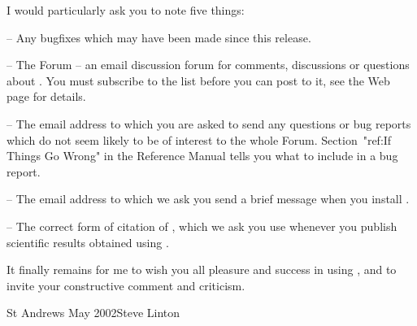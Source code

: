 I would particularly ask you to note five things:
\beginlist%
\item{--} Any bugfixes which may have been made since this release.
\item{--} The  {\GAP} Forum -- an email discussion forum for comments,
discussions or questions about {\GAP}. You must subscribe to the list
before you can post to it, see the Web page for details.
\item{--} The email address  to which you
are asked to send any questions or bug reports which do not seem likely
to be of interest to the whole {\GAP} Forum. Section~"ref:If Things Go Wrong"
in the Reference Manual tells you what to include in a bug report.
\item{--} The email address  to which we ask you
send a brief message when you install {\GAP}.
\item{--} The correct form of citation of {\GAP}, which we ask you use
whenever you publish scientific results obtained using {\GAP}.
\endlist



It finally remains  for me to wish you  all pleasure and success in using
{\GAP}, and to invite your constructive comment and criticism.

St Andrews May 2002\hfill Steve Linton



